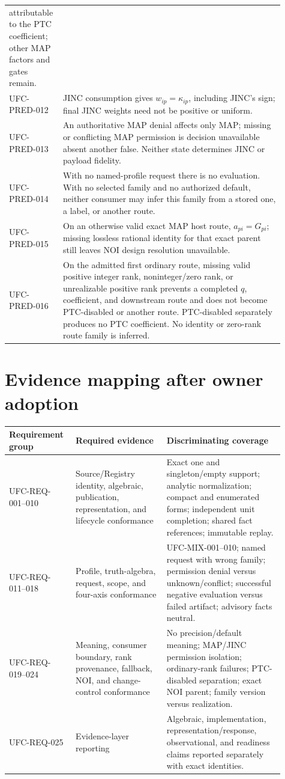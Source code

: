 \begin{longtable}{p{0.14\linewidth}p{0.77\linewidth}}
attributable to the PTC coefficient; other MAP factors and gates remain.\\
UFC-PRED-012 & JINC consumption gives \(w_{ip}=\kappa_{ip}\), including JINC's
sign; final JINC weights need not be positive or uniform.\\
UFC-PRED-013 & An authoritative MAP denial affects only MAP; missing or
conflicting MAP permission is decision unavailable absent another false.
Neither state determines JINC or payload fidelity.\\
UFC-PRED-014 & With no named-profile request there is no evaluation. With no
selected family and no authorized default, neither consumer may infer this
family from a stored one, a label, or another route.\\
UFC-PRED-015 & On an otherwise valid exact MAP host route,
\(a_{pi}=G_{pi}\); missing lossless rational identity for that exact parent
still leaves NOI design resolution unavailable.\\
UFC-PRED-016 & On the admitted first ordinary route, missing valid positive
integer rank, noninteger/zero rank, or unrealizable positive rank prevents a
completed \(q\), coefficient, and downstream route and does not become
PTC-disabled or another route. PTC-disabled separately produces no PTC
coefficient. No identity or zero-rank route family is inferred.\\
\bottomrule
\end{longtable}

\section{Evidence mapping after owner adoption}

\begin{longtable}{p{0.20\linewidth}p{0.31\linewidth}p{0.40\linewidth}}
\toprule
Requirement group & Required evidence & Discriminating coverage\\
\midrule
\endhead
UFC-REQ-001--010 & Source/Registry identity, algebraic, publication,
representation, and lifecycle conformance & Exact one and singleton/empty
support; analytic normalization; compact and enumerated forms; independent
unit completion; shared fact references; immutable replay.\\
UFC-REQ-011--018 & Profile, truth-algebra, request, scope, and four-axis
conformance & UFC-MIX-001--010; named request with wrong family; permission
denial versus unknown/conflict; successful negative evaluation versus failed
artifact; advisory facts neutral.\\
UFC-REQ-019--024 & Meaning, consumer boundary, rank provenance, fallback, NOI,
and change-control conformance & No precision/default meaning; MAP/JINC
permission isolation; ordinary-rank failures; PTC-disabled separation; exact
NOI parent; family version versus realization.\\
UFC-REQ-025 & Evidence-layer reporting & Algebraic, implementation,
representation/response, observational, and readiness claims reported
separately with exact identities.\\
\bottomrule
\end{longtable}

